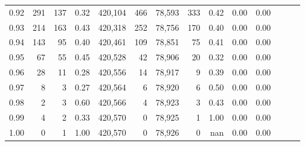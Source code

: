 \begin{tabular}{rrrrrrrrrrrrrr}
0.92 &    291 &    137 &  0.32 &  420,104 &      466 &  78,593 &     333 &  0.42 &  0.00 &      0.00 \\
0.93 &    214 &    163 &  0.43 &  420,318 &      252 &  78,756 &     170 &  0.40 &  0.00 &      0.00 \\
0.94 &    143 &     95 &  0.40 &  420,461 &      109 &  78,851 &      75 &  0.41 &  0.00 &      0.00 \\
0.95 &     67 &     55 &  0.45 &  420,528 &       42 &  78,906 &      20 &  0.32 &  0.00 &      0.00 \\
0.96 &     28 &     11 &  0.28 &  420,556 &       14 &  78,917 &       9 &  0.39 &  0.00 &      0.00 \\
0.97 &      8 &      3 &  0.27 &  420,564 &        6 &  78,920 &       6 &  0.50 &  0.00 &      0.00 \\
0.98 &      2 &      3 &  0.60 &  420,566 &        4 &  78,923 &       3 &  0.43 &  0.00 &      0.00 \\
0.99 &      4 &      2 &  0.33 &  420,570 &        0 &  78,925 &       1 &  1.00 &  0.00 &      0.00 \\
1.00 &      0 &      1 &  1.00 &  420,570 &        0 &  78,926 &       0 &   nan &  0.00 &      0.00 \\
\bottomrule
\end{tabular}
